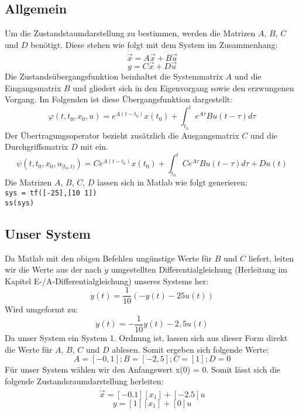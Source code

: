 \subsection{Allgemein}
Um die Zustandstaumdarstellung zu bestimmen, werden die Matrizen $A$, $B$, $C$ und $D$ benötigt. Diese stehen wie folgt mit dem System im Zusammenhang:
\begin{equation*}
  \dot\vec{x} = A\vec{x} + B\vec{u}
\end{equation*}
\begin{equation*}
  y = C\vec{x} + D\vec{u}
\end{equation*}
Die Zustandsübergangsfunktion beinhaltet die Systemmatrix $A$ und die Eingangsmatrix $B$ und gliedert sich in den Eigenvorgang sowie den erzwungenen Vorgang. Im Folgenden ist diese Übergangsfunktion dargestellt:
\begin{equation*}
  \varphi (t,t_0,x_0,u) = e^{A(t-t_0)}x(t_0)+\int_{t_0}^{t}e^{A\tau }Bu(t-\tau )d\tau
\end{equation*}
Der Übertragungsoperator bezieht zusätzlich die Ausgangsmatrix $C$ und die Durchgriffsmatrix $D$ mit ein.
\begin{equation*}
  \psi (t,t_0,x_0,u_{[t_0,t)}) = Ce^{A(t-t_0)}x(t_0)+\int_{t_0}^{t}Ce^{A\tau }Bu(t-\tau )d\tau + Du(t)
\end{equation*}
\vspace*{0.5cm}
Die Matrizen $A$, $B$, $C$, $D$ lassen sich in Matlab wie folgt generieren:\\
\hspace*{0.5cm}\texttt{sys = tf([-25],[10 1])}\\
\hspace*{0.5cm}\texttt{ss(sys)}



\subsection{Unser System}
Da Matlab mit den obigen Befehlen ungünstige Werte für $B$ und $C$ liefert, leiten wir die Werte aus der nach $\dot y$ umgestellten Differentialgleichung (Herleitung im Kapitel E-/A-Differentialgleichung) unseres Systems her: 
\begin{equation*}
  \dot y(t)= \frac{1}{10}(-y(t)-25u(t))
\end{equation*}
Wird umgeformt zu:
\begin{equation*}
  \dot y(t)= -\frac{1}{10}y(t)-2,5u(t)
\end{equation*}
Da unser System ein System 1. Ordnung ist, lassen sich aus dieser Form direkt die Werte für $A$, $B$, $C$ und $D$ ablesen. Somit ergeben sich folgende Werte:
\begin{equation*}
  A = [-0,1]; B = [-2,5]; C = [1]; D = 0
\end{equation*}
Für unser System wählen wir den Anfangswert x(0) = 0.
Somit lässt sich die folgende Zustandsraumdarstellung herleiten:
\begin{equation*}
  \dot \vec{x} = [-0.1][x_1] + [-2.5]u
\end{equation*}
\begin{equation*}
  y = [1][x_1] + [0]u
\end{equation*}